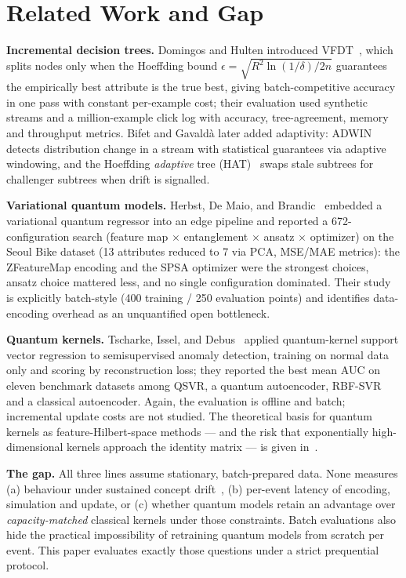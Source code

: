\documentclass[conference]{IEEEtran}
\begin{document}
\section{Related Work and Gap}
\label{sec:related}

\textbf{Incremental decision trees.} Domingos and Hulten introduced VFDT~\cite{domingos2000},
which splits nodes only when the Hoeffding bound
$\epsilon = \sqrt{R^{2}\ln(1/\delta)/2n}$ guarantees the empirically best attribute is the
true best, giving batch-competitive accuracy in one pass with constant per-example cost;
their evaluation used synthetic streams and a million-example click log with accuracy,
tree-agreement, memory and throughput metrics. Bifet and Gavald\`{a} later added
adaptivity: ADWIN~\cite{bifet2007adwin} detects distribution change in a stream with
statistical guarantees via adaptive windowing, and the Hoeffding \emph{adaptive} tree
(HAT)~\cite{bifet2009} swaps stale subtrees for challenger subtrees when drift is
signalled.

\textbf{Variational quantum models.} Herbst, De Maio, and Brandic~\cite{herbst2024}
embedded a variational quantum regressor into an edge pipeline and reported a
672-configuration search (feature map $\times$ entanglement $\times$ ansatz $\times$
optimizer) on the Seoul Bike dataset (13 attributes reduced to 7 via PCA, MSE/MAE
metrics): the ZFeatureMap encoding and the SPSA optimizer were the strongest choices,
ansatz choice mattered less, and no single configuration dominated. Their study is
explicitly batch-style (400 training / 250 evaluation points) and identifies data-encoding
overhead as an unquantified open bottleneck.

\textbf{Quantum kernels.} Tscharke, Issel, and Debus~\cite{tscharke2023} applied
quantum-kernel support vector regression to semisupervised anomaly detection, training on
normal data only and scoring by reconstruction loss; they reported the best mean AUC on
eleven benchmark datasets among QSVR, a quantum autoencoder, RBF-SVR and a classical
autoencoder. Again, the evaluation is offline and batch; incremental update costs are not
studied. The theoretical basis for quantum kernels as feature-Hilbert-space methods ---
and the risk that exponentially high-dimensional kernels approach the identity matrix ---
is given in~\cite{schuld2019}.

\textbf{The gap.} All three lines assume stationary, batch-prepared data. None measures
(a) behaviour under sustained concept drift~\cite{gama2014}, (b) per-event latency of
encoding, simulation and update, or (c) whether quantum models retain an advantage over
\emph{capacity-matched} classical kernels under those constraints. Batch evaluations also
hide the practical impossibility of retraining quantum models from scratch per event.
This paper evaluates exactly those questions under a strict prequential protocol.
\end{document}
